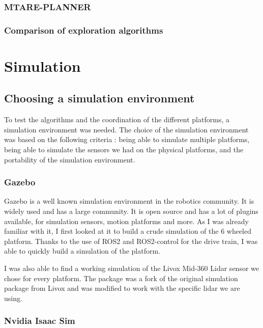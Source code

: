 \documentclass[11pt]{article}
\begin{document}
            \subsubsection{MTARE-PLANNER}
            \subsubsection{Comparison of exploration algorithms}


    \newpage
    \section{Simulation}
        \subsection{Choosing a simulation environment}

            To test the algorithms and the coordination of the different platforms, a simulation environment was needed. The choice of the simulation environment was based on the following criteria : being able to simulate multiple platforms, being able to simulate the sensors we had on the physical platforms, and the portability of the simulation environment.


            \subsubsection{Gazebo}
                Gazebo is a well known simulation environment in the robotics community. It is widely used and has a large community. It is open source and has a lot of plugins available, for simulation sensors, motion platforms and more. As I was already familiar with it, I first looked at it to build a crude simulation of the 6 wheeled platform. Thanks to the use of ROS2 and ROS2-control for the drive train, I was able to quickly build a simulation of the platform. 

                I was also able to find a working simulation of the Livox Mid-360 Lidar sensor we chose for every platform. The package \cite{livox_lidar_simulation_fork} was a fork of the original simulation package from Livox \cite{livox_laser_simulation} and was modified to work with the specific lidar we are using. 
            \subsubsection{Nvidia Isaac Sim}
\end{document}
